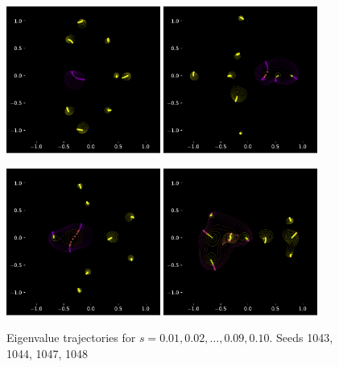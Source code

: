 \documentclass{article}
\begin{document}
	 \newpage

	 \begin{figure}[htbp]
		 \centering
		 \includegraphics[width=0.45\textwidth]{figures/initial_frame1043.pdf}
		 \includegraphics[width=0.45\textwidth]{figures/initial_frame1044.pdf}
 
		 \includegraphics[width=0.45\textwidth]{figures/initial_frame1047.pdf}
		 \includegraphics[width=0.45\textwidth]{figures/initial_frame1048.pdf}
		 \caption{Eigenvalue trajectories for $s= 0.01, 0.02, \dots , 0.09, 0.10$. Seeds 1043, 1044, 1047, 1048}
		 \label{fig:pdf_image}
	  \end{figure}
\end{document}
